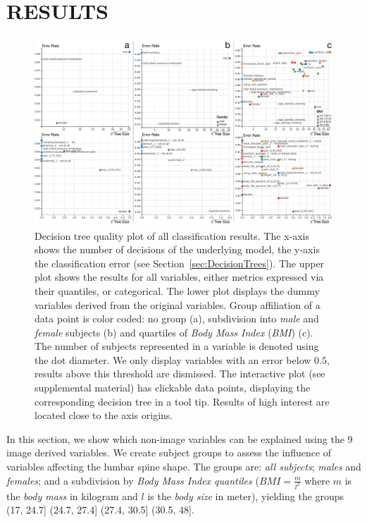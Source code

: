 \documentclass[a4paper,twoside]{style/article}
\begin{document}
\section{\uppercase{Results}}
\begin{figure}[!t]
  \centering
  \includegraphics[width=1\textwidth]{figures/results}
  \caption{
Decision tree quality plot of all classification results.
The x-axis shows the number of decisions of the underlying model, the y-axis the classification error (see Section~\ref{sec:DecisionTrees}).
The upper plot shows the results for all variables, either metrics expressed via their quantiles, or categorical.
The lower plot displays the dummy variables derived from the original variables.
Group affiliation of a data point is color coded:
no group (a), subdivision into \emph{male} and \emph{female} subjects (b) and quartiles of \emph{Body Mass Index} (\emph{BMI}) (c).
The number of subjects represented in a variable is denoted using the dot diameter.
We only display variables with an error below $0.5$, results above this threshold are dismissed.
The interactive plot (see supplemental material) has clickable data points, displaying the corresponding decision tree in a tool tip.
Results of high interest are located close to the axis origins.
}
  \label{fig:results}
\end{figure}
\noindent In this section, we show which non-image variables can be explained using the 9 image derived variables.
We create subject groups to assess the influence of variables affecting the lumbar spine shape.
The groups are: \emph{all subjects}; \emph{males} and \emph{females}; and a subdivision by \emph{Body Mass Index quantiles} ($BMI = \frac{m}{l^2}$ where $m$ is the \emph{body mass} in kilogram and $l$ is the \emph{body size} in meter), yielding the groups (17, 24.7] (24.7, 27.4] (27.4, 30.5] (30.5, 48].
\end{document}
